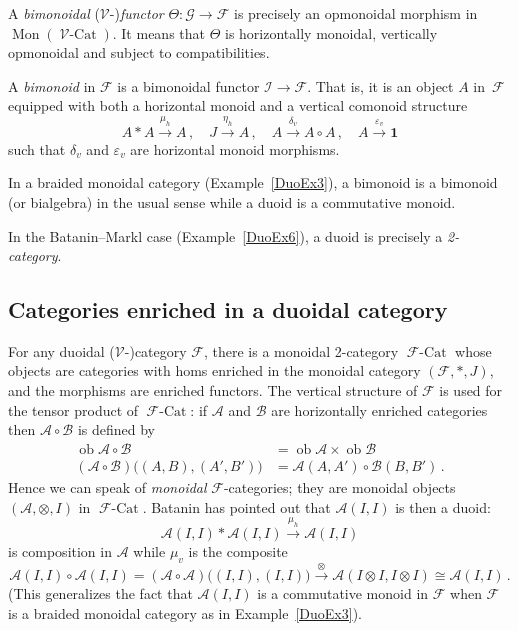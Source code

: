 \documentclass[a4paper,12pt]{article}
\newcommand{\missing}[1]{\marginpar{\color{red}missing:\\#1}}
\theoremstyle{definition}
\theoremstyle{fact}
\theoremstyle{genquest}
\theoremstyle{step}
\newcommand{\catI}{\mathbf{1}}
\newcommand{\catA}{\mathcal{A}}
\newcommand{\catB}{\mathcal{B}}
\newcommand{\catF}{\mathcal{F}}
\newcommand{\FCat}{\operatorname{\mathcal{F}\mbox{-}Cat}}
\newcommand{\catG}{\mathcal{G}}
\newcommand{\scrI}{\mathcal{I}}
\newcommand{\Mon}{\operatorname{Mon}}
\newcommand{\catV}{\mathcal{V}}
\newcommand{\VCat}{\operatorname{\mathcal{V}\mbox{-}Cat}}
\newcommand{\ob}{\operatorname{ob}}
\newcommand{\longto}{\longrightarrow}
\begin{document}
A \emph{bimonoidal} ($\catV$-)\emph{functor} $\Theta : \catG \longto \catF$ is precisely an opmonoidal  morphism in $\Mon(\VCat)$.   It means that $\Theta$ is horizontally monoidal, vertically opmonoidal and subject to compatibilities.

\bigskip

A \emph{bimonoid} in $\catF$ is a bimonoidal functor $\scrI \longto \catF$.  %
That is, it is an object $A$ in~$\catF$ equipped with both a horizontal monoid and a vertical comonoid structure
\[
A \ast A \stackrel{\mu_h}{\longto} A\,, 
\quad J  \stackrel{\eta_h}{\longto} A\,, 
\quad A \stackrel{\delta_v}{\longto} A \circ A\,, 
\quad A \stackrel{\varepsilon_v}{\longto} \catI 
\]
such that $\delta_v$ and $\varepsilon_v$ are horizontal monoid morphisms.

In a braided monoidal category (Example~\ref{DuoEx3}), 
a bimonoid is a bimonoid (or bialgebra) in the usual sense while a duoid is a commutative monoid.

In the Batanin--Markl case (Example~\ref{DuoEx6}), a duoid is precisely a \emph{2-category}.


\subsection{Categories enriched in a duoidal category}

For any duoidal ($\catV$-)category $\catF$, there is a monoidal 2-category $\FCat$
whose objects are categories with homs enriched in the monoidal category $(\catF,\ast,J)$,
and the morphisms are enriched functors.  
The vertical structure of $\catF$ is used for the tensor product of $\FCat$: 
if $\catA$ and $\catB$ are horizontally enriched categories then $\catA \circ \catB$ is defined by
\begin{align*}
\ob \catA \circ \catB &= \ob\catA \times \ob\catB
\\
(\catA \circ \catB) \bigl((A,B),(A',B')\bigr) &= \catA (A,A')   \circ \catB (B,B')\,.
\end{align*}
Hence we can speak of \emph{monoidal} $\catF$-categories; 
they are monoidal objects $(\catA,\otimes,I)$ in  $\FCat$.   
Batanin has pointed out that $\catA(I,I)$ is then a duoid:
\[
\catA(I,I) \ast \catA(I,I) \stackrel{\mu_h}{\longto} \catA(I,I)
\]
is composition in $\catA$ while $\mu_v$ is the composite
\[
\catA (I,I) \circ \catA(I,I) = (\catA \circ \catA) \bigl((I,I),(I,I)\bigr)
 \stackrel{\otimes}{\longto} \catA (I \otimes I, I \otimes I) \cong \catA (I,I)\,.
\]
(This generalizes the fact that $\catA(I,I)$ is a commutative monoid in $\catF$ 
when $\catF$ is a braided monoidal category as in Example~\ref{DuoEx3}).
\end{document}

